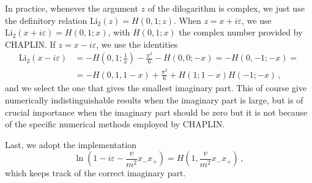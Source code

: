 \documentclass[12pt]{article}
\begin{document}
In practice, whenever the argument $z$ of the dilogarithm is complex, we just use the
definitory relation $\mathrm{Li_2}(z)=H(0,1;z)$. When $z=x+i\varepsilon$, we use $\mathrm{Li_2}(x+i\varepsilon)=H(0,1;x)$, with $H(0,1;x)$ the complex number provided by CHAPLIN. If $z=x-i\varepsilon$, we use the identities
\begin{equation}
  \begin{split}
\mathrm{Li}_{2}\left ( x-i\varepsilon \right )&= -H\left(0,1;\frac{1}{x} \right ) - \frac{\pi^2}{6} - H(0,0; -x)  = -H(0,-1;-x) = \\ & 
= -H\left (0,1, 1-x \right )+ \frac{\pi^2}{6} + H(1;1-x) H(-1;-x)\,,
  \end{split}
\end{equation}
and we select the one that gives the smallest imaginary part. This of course give numerically indistinguishable results when the imaginary part is large, but is of
crucial importance when the imaginary part should be zero but it is
not because of the specific numerical methods employed by CHAPLIN.

Last, we adopt the implementation 
\begin{equation}
  \label{eq:log-implemented}
  \ln\left ( 1 - i \varepsilon - \frac{v}{m^2}x_-x_+ \right ) =H\left(1,\frac{v}{m^2}x_-x_+\right)\,,
\end{equation}
which keeps track of the correct imaginary part.

 



\end{document}
